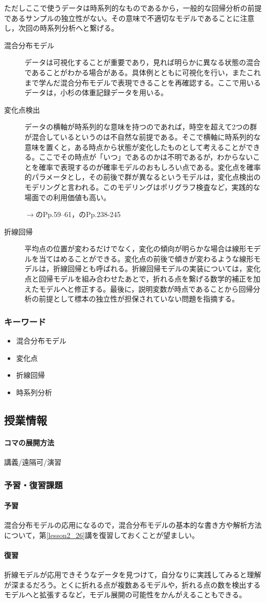ただしここで使うデータは時系列的なものであるから，一般的な回帰分析の前提であるサンプルの独立性がない。その意味で不適切なモデルであることに注意し，次回の時系列分析へと繋げる。
\begin{description}
	\item[混合分布モデル] データは可視化することが重要であり，見れば明らかに異なる状態の混合であることがわかる場合がある。具体例とともに可視化を行い，またこれまで学んだ混合分布モデルで表現できることを再確認する。ここで用いるデータは，小杉の体重記録データを用いる。
	\item[変化点検出] データの横軸が時系列的な意味を持つのであれば，時空を超えて2つの群が混合しているというのは不自然な前提である。そこで横軸に時系列的な意味を置くと，ある時点から状態が変化したものとして考えることができる。ここでその時点が「いつ」であるのかは不明であるが，わからないことを確率で表現するのが確率モデルのおもしろい点である。変化点を確率的パラメータとし，その前後で群が異なるというモデルは，変化点検出のモデリングと言われる。このモデリングはポリグラフ検査など，実践的な場面での利用価値も高い。
	      \begin{flushright}
		      $\to$\textcite{Lee201709}のPp.59--61，\textcite{Matsuura201610}のPp.238-245
	      \end{flushright}
	\item[折線回帰] 平均点の位置が変わるだけでなく，変化の傾向が明らかな場合は線形モデルを当てはめることができる。変化点の前後で傾きが変わるような線形モデルは，折線回帰とも呼ばれる。折線回帰モデルの実装については，変化点と回帰モデルを組み合わせたあとで，折れる点を繋げる数学的補正を加えたモデルへと修正する。最後に，説明変数が時点であることから回帰分析の前提として標本の独立性が担保されていない問題を指摘する。
\end{description}
\subsubsection{キーワード}
\begin{itemize}
	\item 混合分布モデル
	\item 変化点
	\item 折線回帰
	\item 時系列分析
\end{itemize}
\subsection{授業情報}
\paragraph{コマの展開方法}
講義/遠隔可/演習
\subsubsection{予習・復習課題}
\paragraph{予習}混合分布モデルの応用になるので，混合分布モデルの基本的な書き方や解析方法について，第\ref{lesson2_26}講を復習しておくことが望ましい。
\paragraph{復習}折線モデルが応用できそうなデータを見つけて，自分なりに実践してみると理解が深まるだろう。とくに折れる点が複数あるモデルや，折れる点の数を検出するモデルへと拡張するなど，モデル展開の可能性をかんがえることもできる。